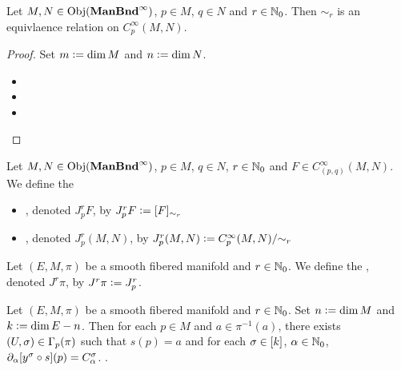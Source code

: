 \documentclass{book}
\begin{document}
\begin{ex}
	Let $M, N \in \operatorname{Obj}(\operatorname*{\text{\textbf{ManBnd}}^{\infty}})$, $p \in M$, $q \in N$ and $r \in \mathbb{N}_0$. Then $\sim_r$ is an equivlaence relation on $C^{\infty}_p(M, N)$.
\end{ex}

\begin{proof}
	Set $m \vcentcolon= \dim M$ and $n \vcentcolon= \dim N$. 
	\begin{itemize}
		\item 
		\item 
		\item 
	\end{itemize}
\end{proof}

\begin{defn}
	Let $M, N \in \operatorname{Obj}(\operatorname*{\text{\textbf{ManBnd}}^{\infty}})$, $p \in M$, $q \in N$, $r \in \mathbb{N}_0$ and $F \in C^{\infty}_{(p,q)}(M, N)$. We define the 
	\begin{itemize}
		\item {}, denoted $J^r_p F$, by $J^r_p F \vcentcolon= [F]_{\sim_r}$
		\item {}, denoted $J_p^r(M,N)$, by $J_p^r(M,N) \vcentcolon= C^{\infty}_p(M, N) / {\sim_r}$
	\end{itemize}
\end{defn}

\begin{defn}
	Let $(E, M, \pi)$ be a smooth fibered manifold and $r \in \mathbb{N}_0$. We define the , denoted $J^r \pi$, by $J^r \pi \vcentcolon= J^r_p$.
\end{defn}

\begin{ex}
	Let $(E, M, \pi)$ be a smooth fibered manifold and $r \in \mathbb{N}_0$. Set $n \vcentcolon= \dim M$ and $k \vcentcolon= \dim E - n$. Then for each $p \in M$ and $a \in \pi^{-1}(a)$, there exists $(U, \sigma) \in \Gamma_p(\pi)$ such that $s(p) = a$ and for each $\sigma \in [k]$, $\alpha \in \mathbb{N}_0$, $\partial_{\alpha}[y^{\sigma} \circ s](p) = C^{\sigma}_{\alpha}$. 
	 .
\end{ex}
\end{document}

